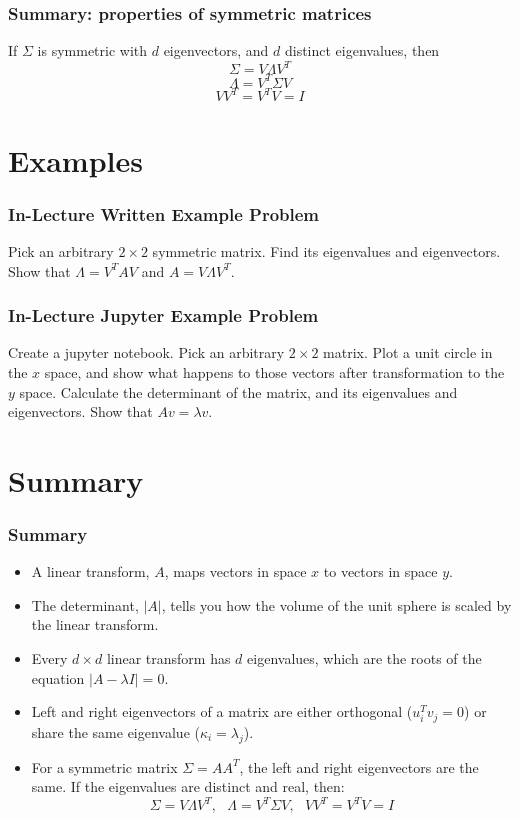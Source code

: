 \documentclass{beamer}
\begin{document}
\begin{frame}
  \frametitle{Summary: properties of symmetric matrices}
  If $\Sigma$ is symmetric with $d$ eigenvectors, and $d$ distinct eigenvalues, then
  \[
  \Sigma=V\Lambda V^T
  \]
  \[
  \Lambda = V^T\Sigma V
  \]
  \[
  VV^T=V^TV=I
  \]
\end{frame}

\section{Examples}
\setcounter{subsection}{1}

\begin{frame}
  \frametitle{In-Lecture Written Example Problem}
  
  Pick an arbitrary $2\times 2$ symmetric matrix.  Find its
  eigenvalues and eigenvectors.  Show that $\Lambda=V^TAV$ and
  $A=V\Lambda V^T$.
\end{frame}
  
\begin{frame}
  \frametitle{In-Lecture Jupyter Example Problem}
  
  Create a jupyter notebook.  Pick an arbitrary $2\times 2$ matrix.
  Plot a unit circle in the ${x}$ space, and show what happens to
  those vectors after transformation to the ${y}$ space.
  Calculate the determinant of the matrix, and its eigenvalues and
  eigenvectors.  Show that $A{v}=\lambda{v}$.
  
\end{frame}
  
\section{Summary}
\setcounter{subsection}{1}

\begin{frame}
  \frametitle{Summary}
  \begin{itemize}
  \item A linear transform, $A$, maps vectors in space ${x}$ to vectors in space ${y}$.
  \item The determinant, $|A|$, tells you how the volume of the unit
    sphere is scaled by the linear transform.
  \item Every $d\times d$ linear transform has $d$ eigenvalues, which
    are the roots of the equation $|A-\lambda I|=0$.
  \item Left and right eigenvectors of a matrix are either orthogonal
    (${u}_i^T{v}_j=0$) or share the same eigenvalue ($\kappa_i=\lambda_j$).
  \item For a symmetric matrix $\Sigma =AA^T$, the left and right eigenvectors
    are the same.  If the eigenvalues are distinct and real, then:
    \[
    \Sigma=V\Lambda V^T,~~~\Lambda = V^T\Sigma V,~~~VV^T=V^TV=I
    \]
  \end{itemize}
\end{frame}
\end{document}
